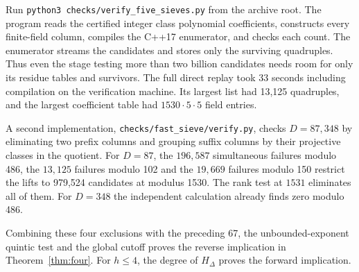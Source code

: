 Run \texttt{python3 checks/verify\_five\_sieves.py} from the archive root.
The program reads the certified integer class polynomial coefficients,
constructs every finite-field column, compiles the C++17 enumerator, and
checks each count. The enumerator streams the candidates and stores only
the surviving quadruples. Thus even the stage testing more than two
billion candidates needs room for only its residue tables and survivors.
The full direct replay took 33 seconds including compilation on the
verification machine. Its largest list had 13,125 quadruples, and
the largest coefficient table had $1530\cdot5\cdot5$ field entries.

A second implementation, \texttt{checks/fast\_sieve/verify.py}, checks $D=87,348$ by eliminating two prefix columns and grouping suffix columns by their projective classes in the quotient. For $D=87$, the $196{,}587$ simultaneous failures modulo 486, the $13{,}125$ failures modulo 102 and the $19{,}669$ failures modulo 150 restrict the lifts to 979,524 candidates at modulus 1530. The rank test at $1531$ eliminates all of them. For $D=348$ the independent calculation already finds zero modulo 486.

Combining these four exclusions with the preceding 67, the unbounded-exponent quintic test and the global cutoff proves the reverse implication in Theorem~\ref{thm:four}. For $h\le4$, the degree of $H_\Delta$ proves the forward implication.
